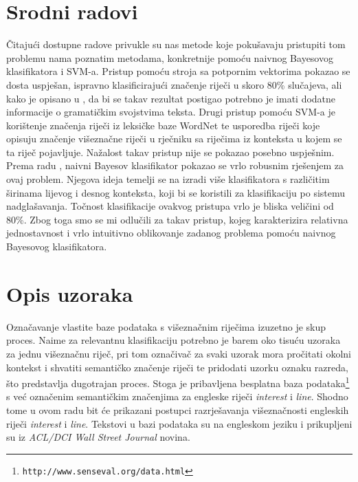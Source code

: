 \documentclass[10pt, a4paper]{article}
\begin{document}
\section{Srodni radovi}
Čitajući dostupne radove privukle su nas metode koje
pokušavaju pristupiti tom problemu nama poznatim metodama,
konkretnije pomoću naivnog Bayesovog klasifikatora i SVM-a.
Pristup pomoću stroja sa potpornim vektorima pokazao se dosta
uspješan, ispravno klasificirajući značenje riječi
u skoro 80\% slučajeva, ali kako je opisano u \citep{lee-etc}, da bi se takav
rezultat postigao
potrebno je imati dodatne informacije
o gramatičkim svojstvima teksta. Drugi pristup
pomoću SVM-a je korištenje značenja  riječi
iz leksičke baze WordNet \citep{buscaldi-etc} te usporedba riječi koje opisuju
značenje višeznačne riječi u rječniku sa riječima
iz konteksta u kojem se ta riječ pojavljuje. Nažalost takav pristup
nije se pokazao posebno uspješnim.
Prema radu \citep{pedersen}, naivni Bayesov klasifikator
pokazao se vrlo robusnim rješenjem za ovaj problem.
Njegova ideja temelji se na izradi više klasifikatora s različitim
širinama lijevog i desnog konteksta,
koji bi se koristili za klasifikaciju po sistemu nadglašavanja.
Točnost klasifikacije ovakvog pristupa vrlo je bliska veličini od 80\%.
Zbog toga smo se mi odlučili za takav pristup, kojeg karakterizira
relativna jednostavnost i vrlo intuitivno oblikovanje zadanog problema
pomoću naivnog Bayesovog klasifikatora.

\section{Opis uzoraka}
Označavanje vlastite baze podataka s višeznačnim riječima izuzetno je
skup proces. Naime za relevantnu klasifikaciju potrebno je barem
oko tisuću uzoraka za jednu višeznačnu riječ, pri tom
označivač za svaki uzorak mora pročitati okolni kontekst i 
shvatiti semantičko značenje riječi te pridodati uzorku oznaku razreda,
što predstavlja dugotrajan proces. Stoga je pribavljena besplatna
baza podataka\footnote{\texttt{http://www.senseval.org/data.html}} s već označenim semantičkim
značenjima za engleske riječi \emph{interest} i \emph{line}. Shodno tome u ovom radu bit će prikazani
postupci razrješavanja višeznačnosti engleskih riječi \emph{interest} i \emph{line}.
Tekstovi u bazi podataka su na engleskom jeziku
i prikupljeni su iz \emph{ACL/DCI Wall Street Journal} novina.
\end{document}
